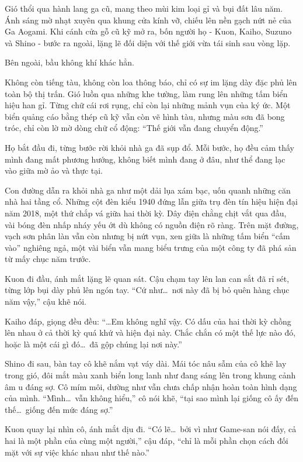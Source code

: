 \documentclass[../main.tex]{subfiles}
\begin{document}
Gió thổi qua hành lang ga cũ, mang theo mùi kim loại gỉ và bụi đất lâu năm. Ánh sáng mờ nhạt xuyên qua khung cửa kính vỡ, chiếu lên nền gạch nứt nẻ của Ga Aogami. Khi cánh cửa gỗ cũ kỹ mở ra, bốn người họ - Kuon, Kaiho, Suzuno và Shino - bước ra ngoài, lặng lẽ đối diện với thế giới vừa tái sinh sau vòng lặp.

Bên ngoài, bầu không khí khác hẳn.

Không còn tiếng tàu, không còn loa thông báo, chỉ có sự im lặng dày đặc phủ lên toàn bộ thị trấn. Gió luồn qua những khe tường, làm rung lên những tấm biển hiệu han gỉ. Từng chữ cái rơi rụng, chỉ còn lại những mảnh vụn của ký ức. Một biển quảng cáo bằng thép cũ kỹ vẫn còn vẽ hình tàu, nhưng màu sơn đã bong tróc, chỉ còn lờ mờ dòng chữ cổ động: ``Thế giới vẫn đang chuyển động.''

Họ bắt đầu đi, từng bước rời khỏi nhà ga đã sụp đổ. Mỗi bước, họ đều cảm thấy mình đang mất phương hướng, không biết mình đang ở đâu, như thể đang lạc vào giữa mờ ảo và thực tại.

Con đường dẫn ra khỏi nhà ga như một dải lụa xám bạc, uốn quanh những căn nhà hai tầng cổ. Những cột đèn kiểu 1940 đứng lẫn giữa trụ đèn tín hiệu hiện đại năm 2018, một thứ chắp vá giữa hai thời kỳ. Dây điện chằng chịt vắt qua đầu, vài bóng đèn nhấp nháy yếu ớt dù không có nguồn điện rõ ràng. Trên mặt đường, vạch sơn phân làn vẫn còn nhưng bị nứt vụn, xen giữa là những tấm biển ``cấm vào'' nghiêng ngả, một vài biển vẫn mang biểu trưng của một công ty đã phá sản từ mấy chục năm trước.


Kuon đi đầu, ánh mắt lặng lẽ quan sát. Cậu chạm tay lên lan can sắt đã rỉ sét, từng lớp bụi dày phủ lên ngón tay. ``Cứ như\dots\ nơi này đã bị bỏ quên hàng chục năm vậy,'' cậu khẽ nói.

Kaiho đáp, giọng đều đều: ``\dots Em không nghĩ vậy. Có dấu của hai thời kỳ chồng lên nhau ở cả thời kỳ quá khứ và hiện đại này. Chắc chắn có một thế lực nào đó, hoặc là một cái gì đó\dots\ đã gộp chúng lại nơi này.''

Shino đi sau, bàn tay cô khẽ nắm vạt váy dài. Mái tóc nâu sẫm của cô khẽ lay trong gió, đôi mắt màu xanh biển long lanh như đang sáng lên trong khung cảnh âm u đáng sợ. Cô mím môi, dường như vẫn chưa chấp nhận hoàn toàn hình dạng của mình. ``Mình\dots\ vẫn không hiểu,'' cô nói khẽ, ``tại sao mình lại giống cô ấy đến thế\dots\ giống đến mức đáng sợ.''

Kuon quay lại nhìn cô, ánh mắt dịu đi. ``Có lẽ\dots\ bởi vì như Game-san nói đấy, cả hai là một phần của cùng một người,'' cậu đáp, ``chỉ là mỗi phần chọn cách đối mặt với sự việc khác nhau như thế nào.''
\end{document}
